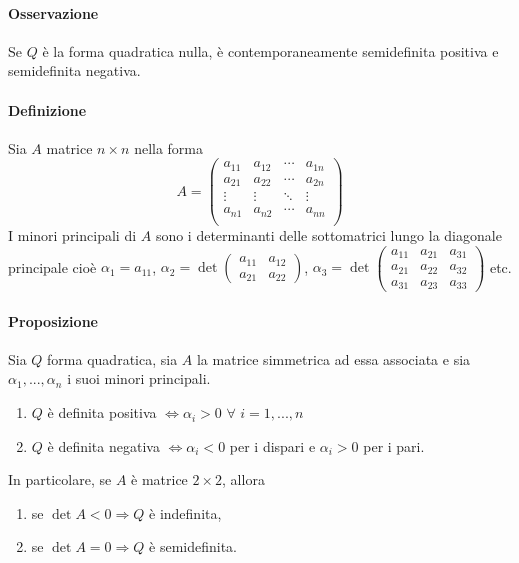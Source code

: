 \documentclass{article}
\begin{document}
\paragraph{{Osservazione}}
Se $Q$ è la forma quadratica nulla, è contemporaneamente semidefinita positiva e semidefinita negativa.
\paragraph{Definizione}
Sia $A$ matrice $n \times n$ nella forma
\begin{equation*}
    A= \begin{pmatrix}
    a_{11}&a_{12} &\cdots &a_{1n} \\
    a_{21}&a_{22} &\cdots &a_{2n} \\
    \vdots&\vdots &\ddots &\vdots \\
    a_{n1}&a_{n2} &\cdots &a_{nn} \\
\end{pmatrix}
\end{equation*}
I minori principali di $A$ sono i determinanti delle sottomatrici lungo la diagonale principale cioè $\alpha_1=a_{11}$, $\alpha_2=\det\begin{pmatrix}
    a_{11}&a_{12} \\
    a_{21}&a_{22}
\end{pmatrix}$, $\alpha_3=\det\begin{pmatrix}
    a_{11}&a_{21}&a_{31} \\
    a_{21}&a_{22}&a_{32} \\
    a_{31}&a_{23}&a_{33} 
\end{pmatrix}$
etc.

\paragraph{{Proposizione}}
Sia $Q$ forma quadratica, sia $A$ la matrice simmetrica ad essa associata e sia $\alpha_1,...,\alpha_n$ i suoi minori principali.
\begin{enumerate}
    \item $Q$ è definita positiva $\Leftrightarrow \alpha_i >0\,\, \forall \,\, i =1,...,n$
    \item $Q$ è definita negativa $\Leftrightarrow \alpha_i <0 $ per i dispari e $\alpha_i>0$ per i pari. 
\end{enumerate}
In particolare, se $A$ è matrice $2 \times 2$, allora
\begin{enumerate}
    \item se $\det A <0 \Rightarrow Q$ è indefinita,
    \item se $\det A=0 \Rightarrow Q$ è semidefinita.
\end{enumerate}
\end{document}
